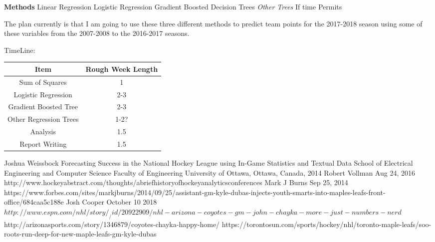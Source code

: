 \documentclass{beamer}
\begin{document}
\begin{frame}
	\textbf{Methods} \newline
	Linear Regression  \newline
	Logistic Regression  \newline
	Gradient Boosted Decision Trees \newline
	\textit{Other Trees}  If time Permits  
	
\end{frame}

\begin{frame}
	The plan currently is that I am going to use these three different methods to predict team points for the 2017-2018 season using some of these variables from the 2007-2008 to the 2016-2017 seasons. \newline
	
\end{frame}

\begin{frame}
TimeLine:
\begin{center}
	\begin{tabular}{|c |c|}
		\hline
		Item & Rough Week Length \\ 
		\hline
		Sum of Squares & 1 \\
		\hline
		Logistic Regression & 2-3 \\
		\hline
		Gradient Boosted Tree & 2-3 \\
		\hline
		Other Regression Trees & 1-2? \\
		\hline
		Analysis & 1.5 \\
		\hline
		Report Writing & 1.5 \\
		\hline
	\end{tabular}
\end{center}

\end{frame}

\begin{thebibliography}{9}
Joshua Weissbock Forecasting Success in the
National Hockey League using
In-Game Statistics and Textual Data School of Electrical Engineering and Computer Science
Faculty of Engineering
University of Ottawa,  Ottawa, Canada, 2014
Robert Vollman Aug 24, 2016 \newline http://www.hockeyabstract.com/thoughts/abriefhistoryofhockeyanalyticsconferences
Mark J Burns Sep 25, 2014 \newline https://www.forbes.com/sites/markjburns/2014/09/25/assistant-gm-kyle-dubas-injects-youth-smarts-into-maples-leafs-front-office/684caa5c188e
Josh Cooper October 10 2018 \newline
$http://www.espn.com/nhl/story/_/id/20922909/nhl-arizona-coyotes-gm-john-chayka-more-just-numbers-nerd$
http://arizonasports.com/story/1346879/coyotes-chayka-happy-home/
https://torontosun.com/sports/hockey/nhl/toronto-maple-leafs/soo-roots-run-deep-for-new-maple-leafs-gm-kyle-dubas

\end{thebibliography}
\end{document}
